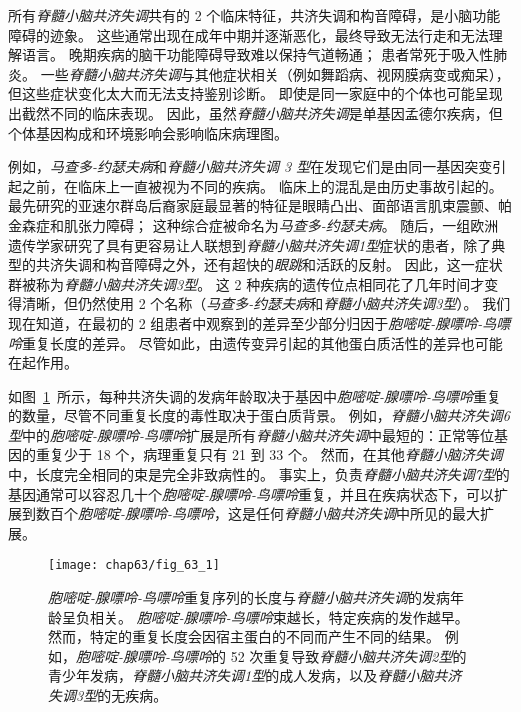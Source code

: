 所有\textit{脊髓小脑共济失调}共有的 2 个临床特征，共济失调和构音障碍，是小脑功能障碍的迹象。
这些通常出现在成年中期并逐渐恶化，最终导致无法行走和无法理解语言。
晚期疾病的脑干功能障碍导致难以保持气道畅通；
患者常死于吸入性肺炎。
一些\textit{脊髓小脑共济失调}与其他症状相关（例如舞蹈病、视网膜病变或痴呆），但这些症状变化太大而无法支持鉴别诊断。
即使是同一家庭中的个体也可能呈现出截然不同的临床表现。
因此，虽然\textit{脊髓小脑共济失调}是单基因孟德尔疾病，但个体基因构成和环境影响会影响临床病理图。


例如，\textit{马查多-约瑟夫病}和\textit{脊髓小脑共济失调 3 型}在发现它们是由同一基因突变引起之前，在临床上一直被视为不同的疾病。
临床上的混乱是由历史事故引起的。
最先研究的亚速尔群岛后裔家庭最显著的特征是眼睛凸出、面部语言肌束震颤、帕金森症和肌张力障碍；
这种综合症被命名为\textit{马查多-约瑟夫病}。
随后，一组欧洲遗传学家研究了具有更容易让人联想到\textit{脊髓小脑共济失调1型}症状的患者，除了典型的共济失调和构音障碍之外，还有超快的\textit{眼跳}和活跃的反射。
因此，这一症状群被称为\textit{脊髓小脑共济失调3型}。
这 2 种疾病的遗传位点相同花了几年时间才变得清晰，但仍然使用 2 个名称（\textit{马查多-约瑟夫病}和\textit{脊髓小脑共济失调3型}）。
我们现在知道，在最初的 2 组患者中观察到的差异至少部分归因于\textit{胞嘧啶-腺嘌呤-鸟嘌呤}重复长度的差异。
尽管如此，由遗传变异引起的其他蛋白质活性的差异也可能在起作用。


如图~\ref{fig:63_1}~所示，每种共济失调的发病年龄取决于基因中\textit{胞嘧啶-腺嘌呤-鸟嘌呤}重复的数量，尽管不同重复长度的毒性取决于蛋白质背景。
例如，\textit{脊髓小脑共济失调6型}中的\textit{胞嘧啶-腺嘌呤-鸟嘌呤}扩展是所有\textit{脊髓小脑共济失调}中最短的：正常等位基因的重复少于 18 个，病理重复只有 21 到 33 个。
然而，在其他\textit{脊髓小脑济失调}中，长度完全相同的束是完全非致病性的。
事实上，负责\textit{脊髓小脑共济失调7型}的基因通常可以容忍几十个\textit{胞嘧啶-腺嘌呤-鸟嘌呤}重复，并且在疾病状态下，可以扩展到数百个\textit{胞嘧啶-腺嘌呤-鸟嘌呤}，这是任何\textit{脊髓小脑共济失调}中所见的最大扩展。



\begin{figure}[htbp]
	\centering
	\texttt{[image: chap63/fig\_63\_1]}
	\caption{\textit{胞嘧啶-腺嘌呤-鸟嘌呤}重复序列的长度与\textit{脊髓小脑共济失调}的发病年龄呈负相关。
		\textit{胞嘧啶-腺嘌呤-鸟嘌呤}束越长，特定疾病的发作越早。
		然而，特定的重复长度会因宿主蛋白的不同而产生不同的结果。
		例如，\textit{胞嘧啶-腺嘌呤-鸟嘌呤}的 52 次重复导致\textit{脊髓小脑共济失调2型}的青少年发病，\textit{脊髓小脑共济失调1型}的成人发病，以及\textit{脊髓小脑共济失调3型}的无疾病。}
	\label{fig:63_1}
\end{figure}


